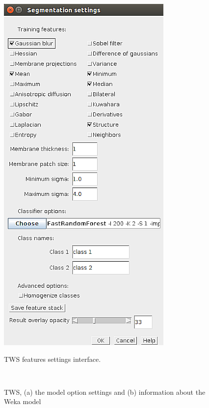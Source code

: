 \begin{figure}[!htbp]\myfloatalign
\includegraphics[width=0.36\linewidth]{gfx5/ctest/twss} \\
\caption[\ac{TWS} features settings interface.]{\ac{TWS} features settings interface.}\label{fig:guifeatures}
\end{figure}
\begin{figure}[!htbp]\myfloatalign
{} \  \
\caption[\ac{TWS} model options interface.]{\ac{TWS}, (a) the model option settings and (b) information about the Weka model}\label{fig:guioptions}
\end{figure}

